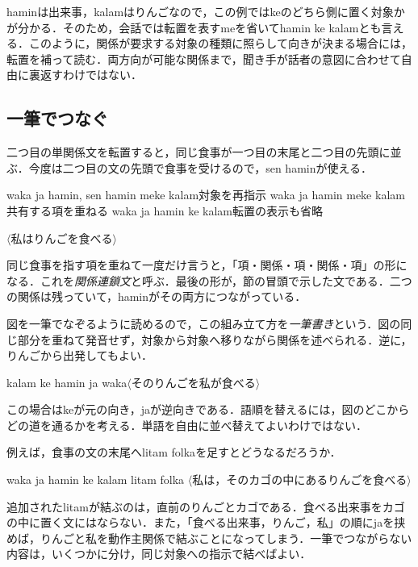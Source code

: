 \documentclass[b5paper, 10pt]{ltjsarticle}
\newcommand{\ko}[1]{\textsf{#1}}
\newcommand{\sentence}[1]{$\langle$#1$\rangle$}
\begin{document}
\ko{hamin}は出来事，\ko{kalam}はりんごなので，この例では\ko{ke}のどちら側に置く対象かが分かる．そのため，会話では転置を表す\ko{me}を省いて\ko{hamin ke kalam}とも言える．このように，関係が要求する対象の種類に照らして向きが決まる場合には，転置を補って読む．両方向が可能な関係まで，聞き手が話者の意図に合わせて自由に裏返すわけではない．

\subsection{一筆でつなぐ}
二つ目の単関係文を転置すると，同じ食事が一つ目の末尾と二つ目の先頭に並ぶ．今度は二つ目の文の先頭で食事を受けるので，\ko{sen hamin}が使える．
\begin{exe}
    \ex\begin{xlist}
        \ex \ko{waka ja hamin, sen hamin meke kalam}\hfill 対象を再指示
        \ex \ko{waka ja hamin meke kalam}\hfill 共有する項を重ねる
        \ex \ko{waka ja hamin ke kalam}\hfill 転置の表示も省略
    \end{xlist}
    \glt \sentence{私はりんごを食べる}
\end{exe}
同じ食事を指す項を重ねて一度だけ言うと，「項・関係・項・関係・項」の形になる．これを\emph{関係連鎖文}と呼ぶ．最後の形が，節の冒頭で示した文である．二つの関係は残っていて，\ko{hamin}がその両方につながっている．

図を一筆でなぞるように読めるので，この組み立て方を\emph{一筆書き}という．図の同じ部分を重ねて発音せず，対象から対象へ移りながら関係を述べられる．逆に，りんごから出発してもよい．
\begin{exe}
    \ex \ko{kalam ke hamin ja waka}\hfill \sentence{そのりんごを私が食べる}
\end{exe}
この場合は\ko{ke}が元の向き，\ko{ja}が逆向きである．語順を替えるには，図のどこからどの道を通るかを考える．単語を自由に並べ替えてよいわけではない．

例えば，食事の文の末尾へ\ko{litam folka}を足すとどうなるだろうか．
\begin{exe}
    \ex \ko{waka ja hamin ke kalam litam folka}
    \glt \sentence{私は，そのカゴの中にあるりんごを食べる}
\end{exe}
追加された\ko{litam}が結ぶのは，直前のりんごとカゴである．食べる出来事をカゴの中に置く文にはならない．また，「食べる出来事，りんご，私」の順に\ko{ja}を挟めば，りんごと私を動作主関係で結ぶことになってしまう．一筆でつながらない内容は，いくつかに分け，同じ対象への指示で結べばよい．
\end{document}
